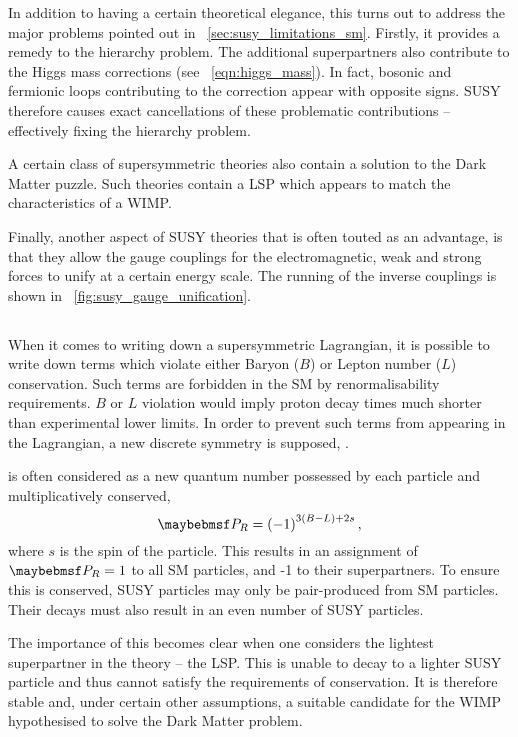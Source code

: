 In addition to having a certain theoretical elegance, this turns out to address
the major problems pointed out in \sec~\ref{sec:susy_limitations_sm}. Firstly,
it provides a remedy to the hierarchy problem. The additional superpartners also
contribute to the Higgs mass corrections (see \eqn~\ref{eqn:higgs_mass}). In
fact, bosonic and fermionic loops contributing to the correction appear with
opposite signs. \acl{SUSY} therefore causes exact cancellations of these
problematic contributions -- effectively fixing the hierarchy problem.

A certain class of supersymmetric theories also contain a solution to the Dark
Matter puzzle. Such theories contain a \acl{LSP} which appears to match the
characteristics of a \ac{WIMP}.

Finally, another aspect of \ac{SUSY} theories that is often touted as an
advantage, is that they allow the gauge couplings for the electromagnetic, weak
and strong forces to unify at a certain energy scale. The running of the inverse
couplings is shown in \fig~\ref{fig:susy_gauge_unification}.

\subsection[R-Parity]{\Rparity}
When it comes to writing down a supersymmetric Lagrangian, it is possible to
write down terms which violate either Baryon ($B$) or Lepton number ($L$)
conservation. Such terms are forbidden in the \ac{SM} by renormalisability
requirements. $B$ or $L$ violation would imply proton decay times much shorter
than experimental lower limits. In order to prevent such terms from appearing in
the Lagrangian, a new discrete symmetry is supposed, \Rparity.

\Rparity is often considered as a new quantum number possessed by each particle
and multiplicatively conserved,
\begin{equation*}
\PR = \left(-1\right)^{3(B-L)+2s},
\end{equation*}
where $s$ is the spin of the particle. This results in an assignment of $\PR =
1$ to all \ac{SM} particles, and -1 to their superpartners. To ensure this is
conserved, \ac{SUSY} particles may only be pair-produced from \ac{SM}
particles. Their decays must also result in an even number of \ac{SUSY}
particles.

The importance of this becomes clear when one considers the lightest
superpartner in the theory -- the \ac{LSP}. This is unable to decay to a lighter
\ac{SUSY} particle and thus cannot satisfy the requirements of \Rparity
conservation. It is therefore stable and, under certain other assumptions, a
suitable candidate for the \ac{WIMP} hypothesised to solve the Dark Matter
problem.

